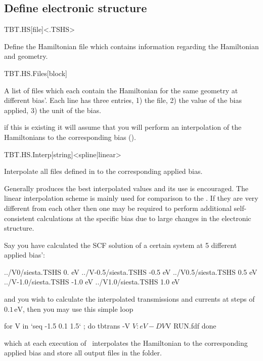 \subsection{Define electronic structure}


\begin{fdfentry}{TBT.HS}[file]<.TSHS>

  Define the Hamiltonian file which contains information regarding the
  Hamiltonian and geometry.

\end{fdfentry}

\begin{fdfentry}{TBT.HS.Files}[block]
  
  A list of files which each contain the Hamiltonian for the same
  geometry at different bias'. 
  Each line has three entries, 1) the  file, 2) the value
  of the bias applied, 3) the unit of the bias.

  \note if this is existing it will assume that you will perform an
  interpolation of the Hamiltonians to the corresponding bias
  (). 

\end{fdfentry}

\begin{fdfentry}{TBT.HS.Interp}[string]<spline|linear>

  Interpolate all files defined in  to the
  corresponding applied bias.

  Generally  produces the best interpolated values and
  its use is encouraged. The linear interpolation scheme is mainly
  used for comparison to the . If they are very different
  from each other then one may be required to perform additional
  self-consistent calculations at the specific bias due to large
  changes in the electronic structure.

\end{fdfentry}

Say you have calculated the SCF solution of a certain system at 5
different applied bias':
\begin{fdfexample}
    ../V0/siesta.TSHS     0.  eV
    ../V-0.5/siesta.TSHS -0.5 eV
    ../V0.5/siesta.TSHS   0.5 eV
    ../V-1.0/siesta.TSHS -1.0 eV
    ../V1.0/siesta.TSHS   1.0 eV
\end{fdfexample}
and you wish to calculate the interpolated transmissions and currents
at steps of $0.1\,\mathrm{eV}$, then you may use this simple loop
\begin{shellexample}
  for V in `seq -1.5 0.1 1.5` ; do
     tbtrans -V $V:eV -D V$V RUN.fdf
  done
\end{shellexample}
which at each execution of \tbtrans\ interpolates the Hamiltonian to
the corresponding applied bias and store all output files in the
 folder.

